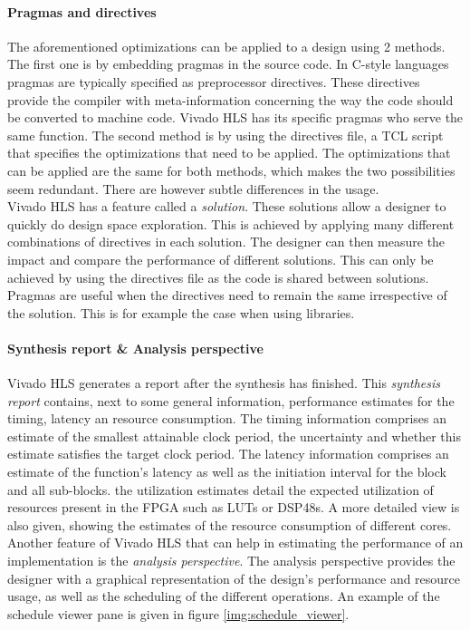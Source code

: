 \paragraph{Pragmas and directives}
The aforementioned optimizations can be applied to a design using 2 methods. The first one is by embedding pragmas in the source code. In C-style languages pragmas are typically specified as preprocessor directives. These directives provide the compiler with meta-information concerning the way the code should be converted to machine code. Vivado HLS has its specific pragmas who serve the same function.
The second method is by using the directives file, a TCL script that specifies the optimizations that need to be applied. The optimizations that can be applied are the same for both methods, which makes the two possibilities seem redundant. There are however subtle differences in the usage.\\
Vivado HLS has a feature called a \emph{solution}. These solutions allow a designer to quickly do design space exploration. This is achieved by applying many different combinations of directives in each solution. The designer can then measure the impact and compare the performance of different solutions. This can only be achieved by using the directives file as the code is shared between solutions. Pragmas are useful when the directives need to remain the same irrespective of the solution. This is for example the case when using libraries.

\paragraph{Synthesis report \& Analysis perspective}
Vivado HLS generates a report after the synthesis has finished. This \emph{synthesis report} contains, next to some general information, performance estimates for the timing, latency an resource consumption. The timing information comprises an estimate of the smallest attainable clock period, the uncertainty and whether this estimate satisfies the target clock period. The latency information comprises an estimate of the function's latency as well as the initiation interval for the block and all sub-blocks. the utilization estimates detail the expected utilization of resources present in the FPGA such as LUTs or DSP48s. A more detailed view is also given, showing the estimates of the resource consumption of different cores.\\
Another feature of Vivado HLS that can help in estimating the performance of an implementation is the \emph{analysis perspective}. The analysis perspective provides the designer with a graphical representation of the design's performance and resource usage, as well as the scheduling of the different operations. An example of the schedule viewer pane is given in figure \ref{img:schedule_viewer}.

